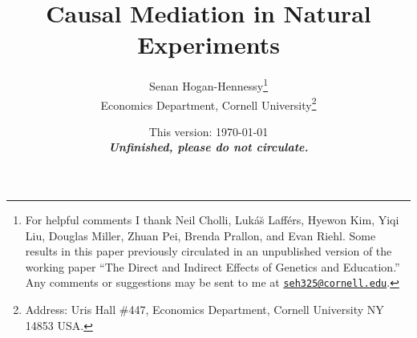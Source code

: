 \documentclass[notitlepage,12pt]{article}
\author{Senan Hogan-Hennessy\thanks{
    For helpful comments I thank
    Neil Cholli,
    Luk\'a\u{s} Laff\'ers,
    Hyewon Kim,
    Yiqi Liu,
    Douglas Miller,
    Zhuan Pei,
    Brenda Prallon,
    and
    Evan Riehl.
    Some results in this paper previously circulated in an unpublished version of the working paper ``The Direct and Indirect Effects of Genetics and Education.''
    Any comments or suggestions may be sent to me at \href{mailto:seh325@cornell.edu}{\nolinkurl{seh325@cornell.edu}}.
    } \\
    \vspace{0.1cm}
    Economics Department, Cornell University\footnote{
        Address: Uris Hall \#447, Economics Department, Cornell University NY 14853 USA.
    }
}
\title{Causal Mediation in Natural Experiments}
\date{
    This version: \today \\ \vspace{0.25cm}
    \textbf{\textit{Unfinished, please do not circulate.}}
    \vspace{-1.0cm}
}
\begin{document}
\clearpage
\maketitle
\thispagestyle{empty}
\begin{abstract}
    
\end{abstract}

\newpage
\setcounter{page}{1}
\doublespacing
\noindent






\singlespacing


%
\newpage

\end{document}
